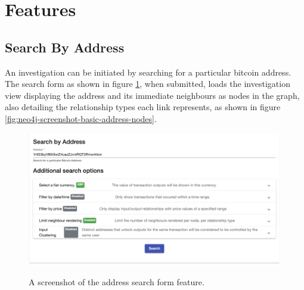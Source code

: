 \section{Features}
\subsection{Search By Address}
An investigation can be initiated by searching for a particular bitcoin address. The search form as shown in figure \ref{fig:neo4j-screenshot-search-form}, when submitted, loads the investigation view displaying the address and its immediate neighbours as nodes in the graph, also detailing the relationship types each link represents, as shown in figure \ref{fig:neo4j-screenshot-basic-address-nodes}. 

\begin{figure}[h!]
  \centering
  \includegraphics[width = 15cm]{./figures/ui-screenshots/search-address-form}\\[0.5cm]
  \caption{A screenshot of the address search form feature.}
  \label{fig:neo4j-screenshot-search-form}
\end{figure}

